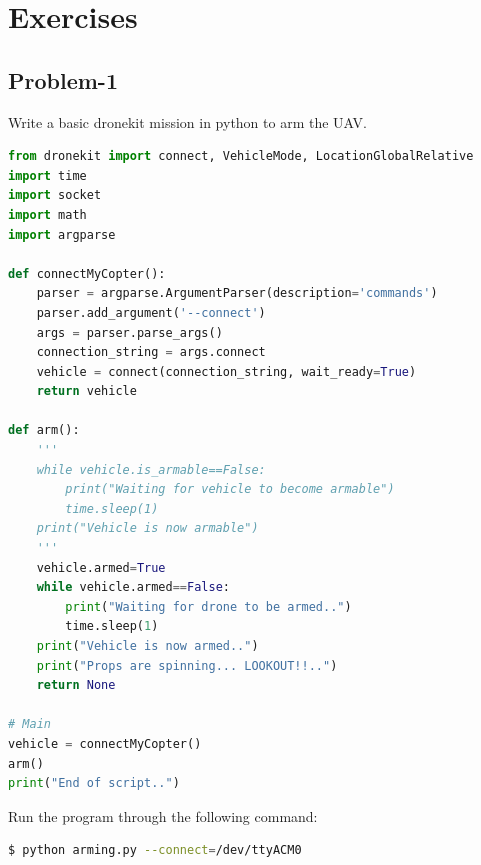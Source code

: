 \documentclass{article}
\begin{document}
\section{Exercises}
\subsection{Problem-1}
Write a basic dronekit mission in python to arm the UAV.

\begin{lstlisting}[language=Python]
from dronekit import connect, VehicleMode, LocationGlobalRelative
import time
import socket
import math
import argparse

def connectMyCopter():
    parser = argparse.ArgumentParser(description='commands')
    parser.add_argument('--connect')
    args = parser.parse_args()
    connection_string = args.connect
    vehicle = connect(connection_string, wait_ready=True)
    return vehicle

def arm():
    '''    
    while vehicle.is_armable==False:
        print("Waiting for vehicle to become armable")
        time.sleep(1)
    print("Vehicle is now armable")
    '''
    vehicle.armed=True
    while vehicle.armed==False:
        print("Waiting for drone to be armed..")
        time.sleep(1)
    print("Vehicle is now armed..")
    print("Props are spinning... LOOKOUT!!..")
    return None

# Main
vehicle = connectMyCopter()
arm()
print("End of script..")

\end{lstlisting}

Run the program through the following command:
\begin{lstlisting}[language=bash]
    $ python arming.py --connect=/dev/ttyACM0
\end{lstlisting}
\end{document}
